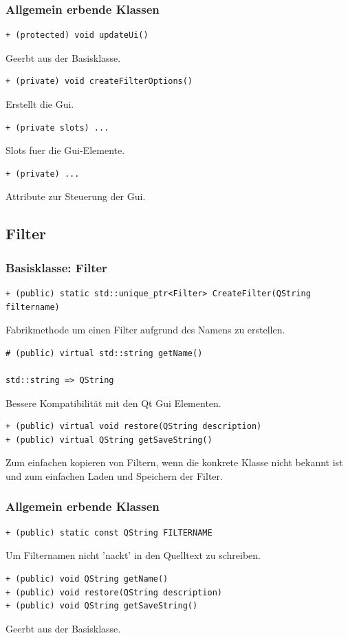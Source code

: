 \documentclass{scrartcl}
\begin{document}
{\subsubsection{Allgemein erbende Klassen}
\bigskip
\begin{verbatim}
+ (protected) void updateUi()
\end{verbatim}
Geerbt aus der Basisklasse.
\bigskip
\begin{verbatim}
+ (private) void createFilterOptions()
\end{verbatim}
Erstellt die Gui.
\bigskip
\begin{verbatim}
+ (private slots) ...
\end{verbatim}
Slots fuer die Gui-Elemente.
\bigskip
\begin{verbatim}
+ (private) ...
\end{verbatim}
Attribute zur Steuerung der Gui.
\newpage
\subsection{Filter}
\subsubsection{Basisklasse: Filter}
\bigskip
\begin{verbatim}
+ (public) static std::unique_ptr<Filter> CreateFilter(QString filtername)
\end{verbatim}
Fabrikmethode um einen Filter aufgrund des Namens zu erstellen.
\bigskip
\begin{verbatim}
# (public) virtual std::string getName()

std::string => QString
\end{verbatim}
Bessere Kompatibilität mit den Qt Gui Elementen.
\bigskip
\begin{verbatim}
+ (public) virtual void restore(QString description)
+ (public) virtual QString getSaveString()
\end{verbatim}
Zum einfachen kopieren von Filtern, wenn die konkrete Klasse nicht bekannt ist und zum einfachen Laden und Speichern der Filter.
\bigskip
\subsubsection{Allgemein erbende Klassen}
\begin{verbatim}
+ (public) static const QString FILTERNAME
\end{verbatim}
Um Filternamen nicht 'nackt' in den Quelltext zu schreiben.
\bigskip
\begin{verbatim}
+ (public) void QString getName()
+ (public) void restore(QString description)
+ (public) void QString getSaveString()
\end{verbatim}
Geerbt aus der Basisklasse. 
\newpage
}
\end{document}
